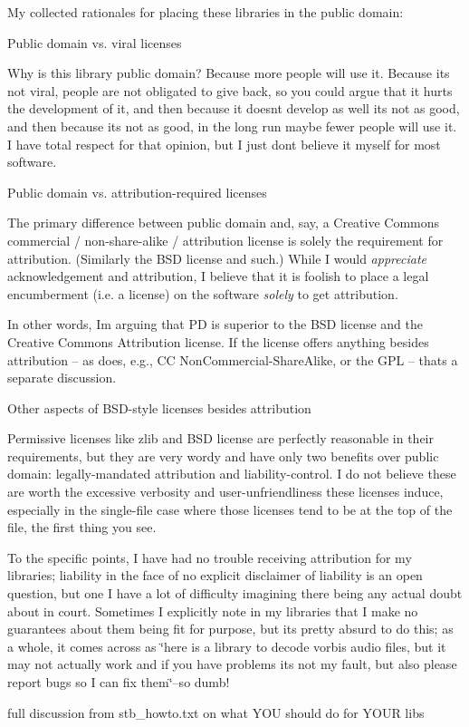 My collected rationales for placing these libraries in the public domain\+:


\begin{DoxyEnumerate}
\item Public domain vs. viral licenses

Why is this library public domain? Because more people will use it. Because it\textquotesingle{}s not viral, people are not obligated to give back, so you could argue that it hurts the development of it, and then because it doesn\textquotesingle{}t develop as well it\textquotesingle{}s not as good, and then because it\textquotesingle{}s not as good, in the long run maybe fewer people will use it. I have total respect for that opinion, but I just don\textquotesingle{}t believe it myself for most software.
\item Public domain vs. attribution-\/required licenses

The primary difference between public domain and, say, a Creative Commons commercial / non-\/share-\/alike / attribution license is solely the requirement for attribution. (Similarly the BSD license and such.) While I would {\itshape appreciate} acknowledgement and attribution, I believe that it is foolish to place a legal encumberment (i.\+e. a license) on the software {\itshape solely} to get attribution.

In other words, I\textquotesingle{}m arguing that PD is superior to the BSD license and the Creative Commons \textquotesingle{}Attribution\textquotesingle{} license. If the license offers anything besides attribution -- as does, e.\+g., CC Non\+Commercial-\/\+Share\+Alike, or the GPL -- that\textquotesingle{}s a separate discussion.
\item Other aspects of BSD-\/style licenses besides attribution

Permissive licenses like zlib and BSD license are perfectly reasonable in their requirements, but they are very wordy and have only two benefits over public domain\+: legally-\/mandated attribution and liability-\/control. I do not believe these are worth the excessive verbosity and user-\/unfriendliness these licenses induce, especially in the single-\/file case where those licenses tend to be at the top of the file, the first thing you see.

To the specific points, I have had no trouble receiving attribution for my libraries; liability in the face of no explicit disclaimer of liability is an open question, but one I have a lot of difficulty imagining there being any actual doubt about in court. Sometimes I explicitly note in my libraries that I make no guarantees about them being fit for purpose, but it\textquotesingle{}s pretty absurd to do this; as a whole, it comes across as \char`\"{}here is a library to decode   vorbis audio files, but it may not actually work and if   you have problems it\textquotesingle{}s not my fault, but also please   report bugs so I can fix them\char`\"{}--so dumb!
\item full discussion from stb\+\_\+howto.\+txt on what YOU should do for YOUR libs
\end{DoxyEnumerate}


